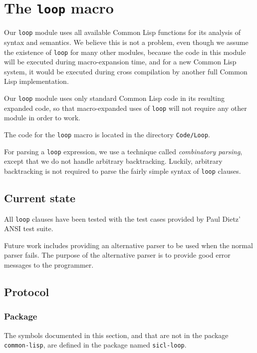 \chapter{The \texttt{loop} macro} 

Our \texttt{loop} module uses all available Common Lisp functions for
its analysis of syntax and semantics.  We believe this is not a
problem, even though we assume the existence of \texttt{loop} for many
other modules, because the code in this module will be executed during
macro-expansion time, and for a new Common Lisp system, it would be
executed during cross compilation by another full Common Lisp
implementation.

Our \texttt{loop} module uses only standard Common Lisp code in its
resulting expanded code, so that macro-expanded uses of \texttt{loop}
will not require any other \sysname{} module in order to work.

The code for the \sysname{} \texttt{loop} macro is located in the
directory \texttt{Code/Loop}.  

For parsing a \texttt{loop} expression, we use a technique called
\emph{combinatory parsing}, except that we do not handle arbitrary
backtracking.  Luckily, arbitrary backtracking is not required to
parse the fairly simple syntax of \texttt{loop} clauses.

\section{Current state}

All \texttt{loop} clauses have been tested with the test cases
provided by Paul Dietz' ANSI \commonlisp{} test suite.

Future work includes providing an alternative parser to be used when
the normal parser fails.  The purpose of the alternative parser is to
provide good error messages to the programmer.

\section{Protocol}

\subsection{Package}

The symbols documented in this section, and that are not in the
package \texttt{common-lisp}, are defined in the package named
\texttt{sicl-loop}.

